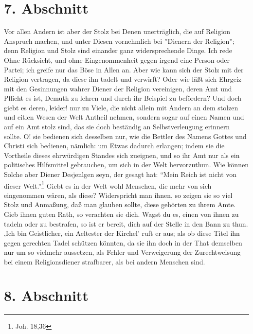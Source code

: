 \section{7. Abschnitt}

Vor allen Andern ist aber der Stolz bei Denen unerträglich, die auf Religion
Anspruch machen, und unter Diesen vornehmlich bei ''Dienern der Religion''; denn
Religion und Stolz sind einander ganz widersprechende Dinge. Ich rede Ohne
Rücksicht, und ohne Eingenommenheit gegen irgend eine Person oder Partei; ich
greife nur das Böse in Allen an. Aber wie kann sich der Stolz mit der Religion
vertragen, da diese ihn tadelt und verwirft? Oder wie läßt sich Ehrgeiz mit den
Gesinnungen wahrer Diener der Religion vereinigen, deren Amt und Pflicht es ist,
Demuth zu lehren und durch ihr Beispiel zu befördern? Und doch giebt es deren,
leider! nur zu Viele, die nicht allein mit Andern an dem stolzen und eitlen
Wesen der Welt Antheil nehmen, sondern sogar auf einen Namen und auf ein Amt
stolz sind, das sie doch beständig an Selbstverleugung erinnern sollte. O! sie
bedienen sich desselben nur, wie die Bettler des Namens Gottes und Christi sich
bedienen, nämlich: um Etwas dadurch erlangen; indem sie die Vortheile dieses
ehrwürdigen Standes sich zueignen, und so ihr Amt nur als ein politisches
Hilfsmittel gebrauchen, um sich in der Welt hervorzuthun. Wie können Solche aber
Diener Desjenlgen seyn, der gesagt hat: "`Mein Reich ist nicht von dieser
Welt."'\footnote{Joh. 18,36} Giebt es in der Welt wohl Menschen, die mehr von
sich eingenommen wären, als diese? Widerspricht man ihnen, so zeigen sie so viel
Stolz und Anmaßung, daß man glauben sollte, diese gehörten zu ihrem Amte. Gieb
ihnen guten Rath, so verachten sie dich. Wagst du es, einen von ihnen zu tadeln
oder zu bestrafen, so ist er bereit, dich auf der Stelle in den Bann zu thun.
‚Ich bin Geistlicher, ein Aeltester der Kirchel’ ruft er aus; als ob diese Titel
ihn gegen gerechten Tadel schützen könnten, da sie ihn doch in der That
demselben nur um so vielmehr aussetzen, als Fehler und Verweigerung der
Zurechtweisung bei einem Religionsdiener strafbarer, als bei andern Menschen
sind.

\section{8. Abschnitt}

